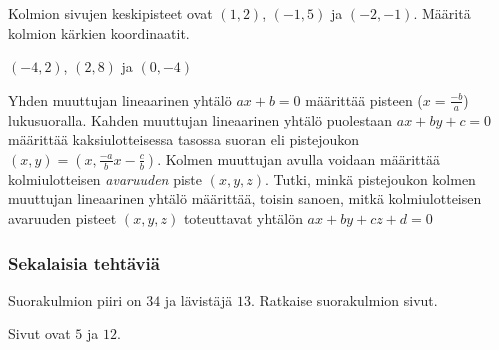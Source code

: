 \begin{tehtavasivu}
\begin{tehtava}
	Kolmion sivujen keskipisteet ovat $(1,2)$, $(-1,5)$ ja $(-2,-1)$. Määritä kolmion kärkien koordinaatit.
	\begin{vastaus}
		$(-4,2)$, $(2,8)$ ja $(0,-4)$
	\end{vastaus}
\end{tehtava}


\begin{tehtava}
  Yhden muuttujan lineaarinen yhtälö $ax +b = 0$ määrittää pisteen ($x = \frac{-b}{a}$) lukusuoralla.
  Kahden muuttujan lineaarinen yhtälö puolestaan $ax +by +c = 0$ määrittää kaksiulotteisessa tasossa suoran eli pistejoukon $(x,y) = (x, \frac{-a}{b}x - \frac{c}{b})$.
  Kolmen muuttujan avulla voidaan määrittää kolmiulotteisen \emph{avaruuden} piste $(x, y, z)$.
  Tutki, minkä pistejoukon kolmen muuttujan lineaarinen yhtälö määrittää, toisin sanoen, mitkä kolmiulotteisen avaruuden pisteet $(x, y, z)$ toteuttavat yhtälön $ax +by +cz +d = 0$
  \begin{vastaus}
  \end{vastaus}
\end{tehtava}

\subsubsection*{Sekalaisia tehtäviä}

\begin{tehtava} 
Suorakulmion piiri on $34$ ja lävistäjä $13$. Ratkaise suorakulmion sivut.
    \begin{vastaus}
	Sivut ovat $5$ ja $12$.
    \end{vastaus}
\end{tehtava}

\end{tehtavasivu}
